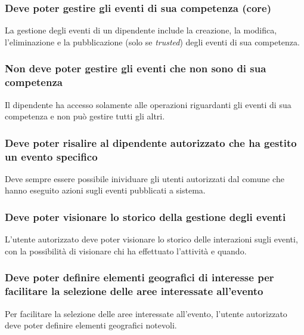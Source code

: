 \documentclass{article}
\begin{document}
\subsubsection{Deve poter gestire gli eventi di sua competenza (core)}
\label{5.3.2}
La gestione degli eventi di un dipendente include la creazione, la modifica, l'eliminazione e la pubblicazione (solo se \textit{trusted}) degli eventi di sua competenza.

\subsubsection{Non deve poter gestire gli eventi che non sono di sua competenza}
\label{5.3.3}
Il dipendente ha accesso solamente alle operazioni riguardanti gli eventi di sua competenza e non può gestire tutti gli altri.

\subsubsection{Deve poter risalire al dipendente autorizzato che ha gestito un evento specifico}
\label{5.3.4}
Deve sempre essere possibile inividuare gli utenti autorizzati dal comune che hanno eseguito azioni sugli eventi pubblicati a sistema.

\subsubsection{Deve poter visionare lo storico della gestione degli eventi}
\label{5.3.5}
L'utente autorizzato deve poter visionare lo storico delle interazioni sugli eventi, con la possibilità di visionare chi ha effettuato l'attività e quando.

\subsubsection{Deve poter definire elementi geografici di interesse per facilitare la selezione delle aree interessate all'evento}
\label{5.3.6}
Per facilitare la selezione delle aree interessate all'evento, l'utente autorizzato deve poter definire elementi geografici notevoli.
\end{document}
